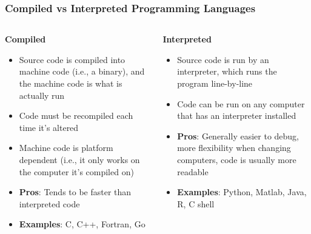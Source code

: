 \documentclass[hyperref,pdfa,unicode,utf8,usepdftitle]{beamer}
\begin{document}
\begin{frame}
  \frametitle{Compiled vs Interpreted Programming Languages}
  \begin{columns}
    \begin{column}{0.5\textwidth}
      \begin{center}
        \textbf{Compiled}
      \end{center}
      \begin{itemize}
      \item Source code is compiled into machine code (i.e., a
        binary), and the machine code is what is actually run
      \item Code must be recompiled each time it’s altered
      \item Machine code is platform dependent (i.e., it only works on
        the computer it’s compiled on)
      \item \textbf{Pros}: Tends to be faster than interpreted code
      \item \textbf{Examples}: C, C++, \alert{Fortran}, Go
      \end{itemize}
    \end{column}
    \begin{column}{0.5\textwidth}
      \begin{center}
        \textbf{Interpreted}
      \end{center}
      \begin{itemize}
      \item Source code is run by an interpreter, which runs the
        program line-by-line
      \item Code can be run on any computer that has an interpreter
        installed
      \item \textbf{Pros}: Generally easier to debug, more flexibility
        when changing computers, code is usually more readable
      \item \textbf{Examples}: Python, Matlab, Java, R, C shell
      \end{itemize}
    \end{column}
  \end{columns}
\end{frame}
\end{document}
